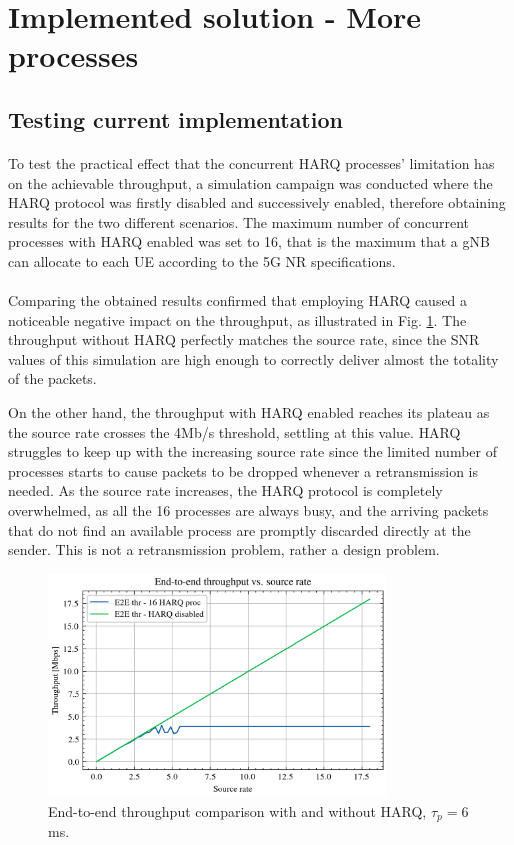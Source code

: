 \section{Implemented solution - More processes}
\subsection{Testing current implementation}
\paragraph{}
To test the practical effect that the concurrent \ac{HARQ} processes' limitation has on the achievable throughput, a simulation campaign was conducted where the \ac{HARQ} protocol was firstly disabled and successively enabled, therefore obtaining results for the two different scenarios. The maximum number of concurrent processes with \ac{HARQ} enabled was set to 16, that is the maximum that a \ac{gNB} can allocate to each \ac{UE} according to the 5G \ac{NR} specifications.

\paragraph{}
Comparing the obtained results confirmed that employing \ac{HARQ} caused a noticeable negative impact on the throughput, as illustrated in Fig. \ref{fig:harq_on_off}. The throughput without \ac{HARQ} perfectly matches the source rate, since the \ac{SNR} values of this simulation are high enough to correctly deliver almost the totality of the packets. 

On the other hand, the throughput with \ac{HARQ} enabled reaches its plateau as the source rate crosses the 4Mb/s threshold, settling at this value. \ac{HARQ} struggles to keep up with the increasing source rate since the limited number of processes starts to cause packets to be dropped whenever a retransmission is needed. As the source rate increases, the \ac{HARQ} protocol is completely overwhelmed, as all the 16 processes are always busy, and the arriving packets that do not find an available process are promptly discarded directly at the sender. This is not a retransmission problem, rather a design problem.


\begin{figure}[ht]
    \centering
    \includegraphics[width=0.8\textwidth]{res/harq-onoff2.png}
    \caption{End-to-end throughput comparison with and without \ac{HARQ}, $\tau_p=6$ms.}
    \label{fig:harq_on_off}
\end{figure}

